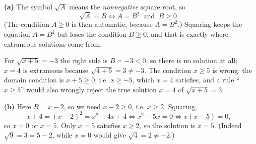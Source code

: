 \textbf{(a)} The symbol $\sqrt{A}$ means the \emph{nonnegative} square root, so
\[\sqrt A=B\iff A=B^2\ \text{ and }\ B\ge0.\]
(The condition $A\ge0$ is then automatic, because $A=B^2$.) Squaring keeps the equation $A=B^2$ but loses the condition $B\ge0$, and that is exactly where extraneous solutions come from.

For $\sqrt{x+5}=-3$ the right side is $B=-3<0$, so there is no solution at all; $x=4$ is extraneous because $\sqrt{4+5}=3\ne-3$. The condition $x\ge5$ is wrong: the domain condition is $x+5\ge0$, i.e. $x\ge-5$, which $x=4$ satisfies, and a rule ``$x\ge5$'' would also wrongly reject the true solution $x=4$ of $\sqrt{x+5}=3$.

\textbf{(b)} Here $B=x-2$, so we need $x-2\ge0$, i.e. $x\ge2$. Squaring,
\[x+4=(x-2)^2=x^2-4x+4\iff x^2-5x=0\iff x(x-5)=0,\]
so $x=0$ or $x=5$. Only $x=5$ satisfies $x\ge2$, so the solution is $\boxed{x=5}$. (Indeed $\sqrt9=3=5-2$, while $x=0$ would give $\sqrt4=2\ne-2$.)

